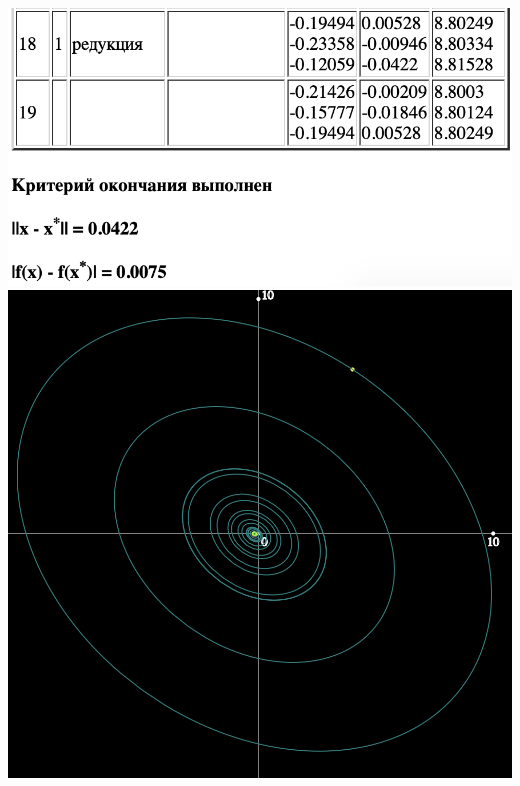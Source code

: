 \includegraphics[width=0.8\linewidth]{images/4_rep3}\\
\includegraphics[width=\linewidth]{images/4_graf}\\

\pagebreak
